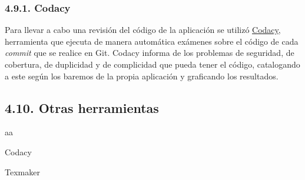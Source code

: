 \subsubsection{4.9.1. Codacy}

Para llevar a cabo una revisión del código de la aplicación se utilizó \href{https://www.codacy.com/}{Codacy}, herramienta que ejecuta de manera automática exámenes sobre el código de cada \textit{commit} que se realice en Git. Codacy informa de los problemas de seguridad, de cobertura, de duplicidad y de complicidad que pueda tener el código, catalogando a este según los baremos de la propia aplicación y graficando los resultados.

\subsection{4.10. Otras herramientas}

aa

Codacy

Texmaker
